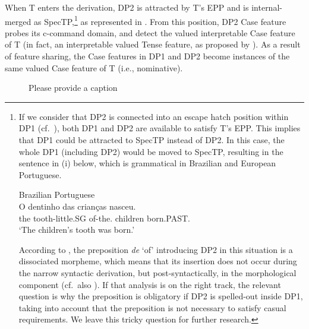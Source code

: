\documentclass[output=paper]{langsci/langscibook}
\begin{document}
When T enters the derivation, DP2 is attracted by T’s \gls{EPP} and is
internal-merged as SpecTP,\footnote{If we consider that DP2 is connected into
    an escape hatch position within DP1 (cf.\ \citealt{Avelar2006}), both DP1
    and DP2 are available to satisfy T’s \gls{EPP}. This implies that DP1 could
    be attracted to SpecTP instead of DP2. In this case, the whole DP1
    (including DP2) would be moved to SpecTP, resulting in the sentence in (i)
    below, which is grammatical in Brazilian and European Portuguese.

    \begin{exe}
        Brazilian Portuguese\\
        \gll    O dentinho das   crianças nasceu.\\
                the tooth-little.SG of-the.\Pl{} children born.PAST.\Tsg{}\\
        \glt    ‘The children’s tooth was born.’
    \end{exe}

According to \citet{Avelar2006}, the preposition \emph{de} ‘of’ introducing DP2
in this situation is a dissociated morpheme, which means that its insertion
does not occur during the narrow syntactic derivation, but post-syntactically,
in the morphological component (cf.\ also \citealt{Raposo2002}). If that
analysis is on the right track, the relevant question is why the preposition is
obligatory if DP2 is spelled-out inside DP1, taking into account that the
preposition is not necessary to satisfy casual requirements.  We leave this
tricky question for further research.} as represented in . From
this position, DP2 Case feature probes its c-command domain, and detect the
valued interpretable Case feature of T (in fact, an interpretable valued Tense
feature, as proposed by \citealt{PesTor2004}). As a result of feature
sharing, the Case features in DP1 and DP2 become instances of the same valued
Case feature of T (i.e., nominative).

\begin{figure}%
    \caption{\color{red}Please provide a caption\label{fig:ex:14.35}}
\end{figure}
\end{document}
